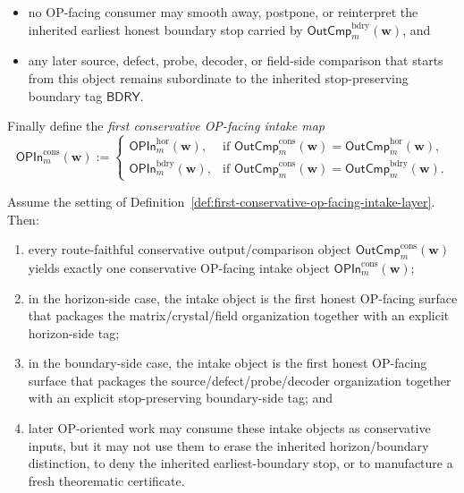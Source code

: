 \begin{definition}
\begin{enumerate}[label=(\roman*)]
\begin{itemize}[leftmargin=2em]
    \item no OP-facing consumer may smooth away, postpone, or reinterpret the inherited earliest honest boundary stop carried by \(\mathsf{OutCmp}^{\mathrm{bdry}}_{m}(\mathbf w)\), and
    \item any later source, defect, probe, decoder, or field-side comparison that starts from this object remains subordinate to the inherited stop-preserving boundary tag \(\mathsf{BDRY}\).
  \end{itemize}
\end{enumerate}
Finally define the \emph{first conservative OP-facing intake map}
\[
  \mathsf{OPIn}^{\mathrm{cons}}_{m}(\mathbf w)
  :=
  \begin{cases}
    \mathsf{OPIn}^{\mathrm{hor}}_{m}(\mathbf w), & \text{if }\mathsf{OutCmp}^{\mathrm{cons}}_{m}(\mathbf w)=\mathsf{OutCmp}^{\mathrm{hor}}_{m}(\mathbf w),\\[2mm]
    \mathsf{OPIn}^{\mathrm{bdry}}_{m}(\mathbf w), & \text{if }\mathsf{OutCmp}^{\mathrm{cons}}_{m}(\mathbf w)=\mathsf{OutCmp}^{\mathrm{bdry}}_{m}(\mathbf w).
  \end{cases}
\]
\end{definition}

\begin{proposition}
\label{prop:every-route-faithful-conservative-output-comparison-object-yields-exactly-one-conservative-op-facing-intake-object}
Assume the setting of Definition~\ref{def:first-conservative-op-facing-intake-layer}. Then:
\begin{enumerate}[label=(\roman*)]
  \item every route-faithful conservative output/comparison object \(\mathsf{OutCmp}^{\mathrm{cons}}_{m}(\mathbf w)\) yields exactly one conservative OP-facing intake object \(\mathsf{OPIn}^{\mathrm{cons}}_{m}(\mathbf w)\);
  \item in the horizon-side case, the intake object is the first honest OP-facing surface that packages the matrix/crystal/field organization together with an explicit horizon-side tag;
  \item in the boundary-side case, the intake object is the first honest OP-facing surface that packages the source/defect/probe/decoder organization together with an explicit stop-preserving boundary-side tag; and
  \item later OP-oriented work may consume these intake objects as conservative inputs, but it may not use them to erase the inherited horizon/boundary distinction, to deny the inherited earliest-boundary stop, or to manufacture a fresh theorematic certificate.
\end{enumerate}
\end{proposition}

